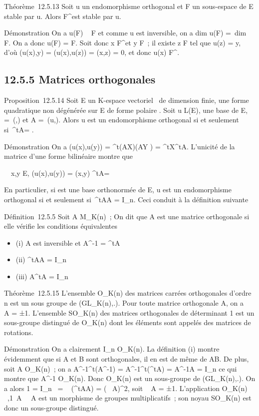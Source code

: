\documentclass[]{article}
\begin{document}
Théorème~12.5.13 Soit u un endomorphisme orthogonal et F un sous-espace
de E stable par u. Alors F^\bot est stable par u.

Démonstration On a u(F) \subset~ F et comme u est inversible, on a
dim u(F) =\ dim~ F. On
a donc u(F) = F. Soit donc x \in F^\bot et y \in F~; il existe z \in F
tel que u(z) = y, d'où \phi(u(x),y) = \phi(u(x),u(z)) = \phi(x,z) = 0, et donc
u(x) \in F^\bot.

\subsection{12.5.5 Matrices orthogonales}

Proposition~12.5.14 Soit E un K-espace vectoriel ~de dimension finie, \Phi
une forme quadratique non dégénérée sur E de forme polaire \phi. Soit u \in
L(E),  une base de E, \Omega =\
\mathrmMat (\phi,) et A =\
\mathrmMat (u,). Alors u est un endomorphisme
orthogonal si et seulement si~^tA\OmegaA = \Omega.

Démonstration On a \phi(u(x),u(y)) = ^t(AX)\Omega(AY ) =
^tX^tA\OmegaAY . L'unicité de la matrice d'une forme
bilinéaire montre que

\forall~~x,y \in E, \phi(u(x),u(y)) = \phi(x,y)
\Leftrightarrow ^tA\OmegaA = \Omega

En particulier, si  est une base orthonormée de E, u est un
endomorphisme orthogonal si et seulement si~^tAA =
I_n. Ceci conduit à la définition suivante

Définition~12.5.5 Soit A \in M_K(n)~; On dit que A est une
matrice orthogonale si elle vérifie les conditions équivalentes

\begin{itemize}
\itemsep1pt\parskip0pt
\item
  (i) A est inversible et A^-1 = ^tA
\item
  (ii) ^tAA = I_n
\item
  (iii) A^tA = I_n
\end{itemize}

Théorème~12.5.15 L'ensemble O_K(n) des matrices carrées
orthogonales d'ordre n est un sous groupe de (GL_K(n),.). Pour
toute matrice orthogonale A, on a
\mathrm{det}~ A = ±1.
L'ensemble SO_K(n) des matrices orthogonales de déterminant 1
est un sous-groupe distingué de O_K(n) dont les éléments sont
appelés des matrices de rotations.

Démonstration On a clairement I_n \in O_K(n). La
définition (i) montre évidemment que si A et B sont orthogonales, il en
est de même de AB. De plus, soit A \in O_K(n)~; on a
A^-1^t(A^-1) =
A^-1^t(^tA) = A^-1A =
I_n ce qui montre que A^-1 \in O_K(n). Donc
O_K(n) est un sous-groupe de (GL_K(n),.). On a alors 1
=  I_n~
= ~
(^tAA) =
(~
A)^2, soit
~ A = ±1.
L'application O_K(n) \rightarrow~,1\,
A\mapsto~\mathrm{det}~
A est un morphisme de groupes multiplicatifs~; son noyau
SO_K(n) est donc un sous-groupe distingué.
\end{document}
